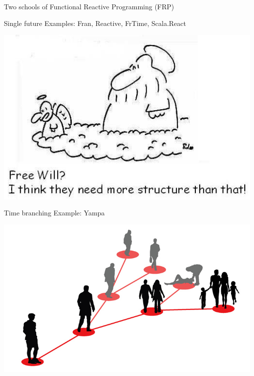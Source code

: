 \documentclass{beamer}
\begin{document}
\begin{frame}{Two schools of Functional Reactive Programming (FRP)}

\begin{block}{Single future}
Examples: Fran, Reactive, FrTime, Scala.React \\
\vspace{-0.3cm}
\begin{center}
\includegraphics[scale=0.25]{free-will.jpg}
\end{center}
\vspace{-0.5cm}
\end{block}
\begin{block}{Time branching}
Example: Yampa
\vspace{-0.3cm}
\begin{center}
\includegraphics[scale=0.15]{many-worlds.png}
\end{center}
\vspace{-0.2cm}
\end{block}

\end{frame}
\end{document}
